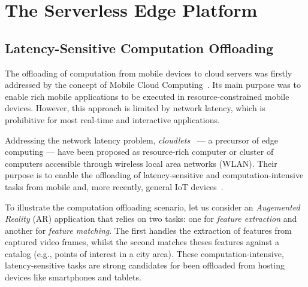 \section{The Serverless Edge Platform}\label{sec:SEP}

\subsection{Latency-Sensitive Computation Offloading}\label{sec:SEP_MCO}


The offloading of computation from mobile devices to cloud servers was firstly addressed by the concept of Mobile Cloud Computing~\cite{Khan:14}. Its main purpose was to enable rich mobile applications to be executed in resource-constrained mobile devices. However, this approach is limited by network latency, which is prohibitive for most real-time and interactive applications.

Addressing the network latency problem, \textit{cloudlets}~\cite{Satyanarayanan:2009} --- a precursor of edge computing --- have been proposed as resource-rich computer or cluster of computers  accessible through wireless local area networks (WLAN). Their purpose is to enable the offloading of latency-sensitive and computation-intensive tasks from mobile and, more recently, general IoT devices~\cite{Satyanarayanan:2017}. 




To illustrate the computation offloading scenario, let us consider an \textit{Augemented Reality} (AR) application that relies on two tasks: one for \textit{feature extraction} and another for \textit{feature matching}. The first handles the extraction of features from captured video frames, whilst the second matches theses features against a catalog (e.g., points of interest in a city area). 
These computation-intensive, latency-sensitive tasks are strong candidates for been offloaded from hosting devices like smartphones and tablets.

